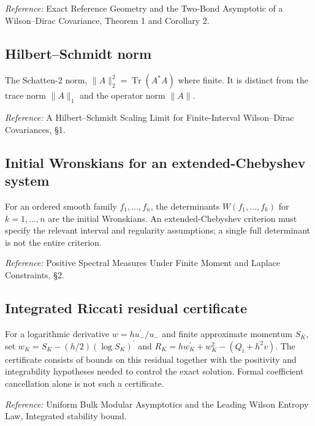 \documentclass[
  10pt,
  a4paper,
]{article}
\begin{document}
\nopagebreak[4]

\emph{Reference:} Exact Reference Geometry and the Two-Bond Asymptotic of a Wilson--Dirac Covariance, Theorem 1 and Corollary 2.

\subsection{Hilbert--Schmidt norm}\label{hilbertschmidt-norm}

The Schatten-2 norm, \(\|A\|_2^2=\operatorname{Tr}(A^*A)\) where finite. It is distinct from the trace norm \(\|A\|_1\) and the operator norm \(\|A\|\).

\nopagebreak[4]

\emph{Reference:} A Hilbert--Schmidt Scaling Limit for Finite-Interval Wilson--Dirac Covariances, §1.

\subsection{Initial Wronskians for an extended-Chebyshev system}\label{initial-wronskians-for-an-extended-chebyshev-system}

For an ordered smooth family \(f_1,\ldots,f_n\), the determinants \(W(f_1,\ldots,f_k)\) for \(k=1,\ldots,n\) are the initial Wronskians. An extended-Chebyshev criterion must specify the relevant interval and regularity assumptions; a single full determinant is not the entire criterion.

\nopagebreak[4]

\emph{Reference:} Positive Spectral Measures Under Finite Moment and Laplace Constraints, §2.

\subsection{Integrated Riccati residual certificate}\label{integrated-riccati-residual-certificate}

For a logarithmic derivative \(w=hu_-^{\prime}/u_-\) and finite approximate momentum \(S_K\), set \(w_K=S_K-(h/2)(\log S_K)^{\prime}\) and \(R_K=hw_K^{\prime}+w_K^2-(Q_t+h^2v)\). The certificate consists of bounds on this residual together with the positivity and integrability hypotheses needed to control the exact solution. Formal coefficient cancellation alone is not such a certificate.

\nopagebreak[4]

\emph{Reference:} Uniform Bulk Modular Asymptotics and the Leading Wilson Entropy Law, Integrated stability bound.
\end{document}
